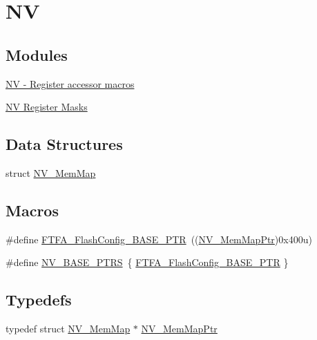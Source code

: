 \hypertarget{group___n_v___peripheral}{}\section{N\+V}
\label{group___n_v___peripheral}
\subsection*{Modules}
\begin{DoxyCompactItemize}
\item 
\hyperlink{group___n_v___register___accessor___macros}{N\+V -\/ Register accessor macros}
\item 
\hyperlink{group___n_v___register___masks}{N\+V Register Masks}
\end{DoxyCompactItemize}
\subsection*{Data Structures}
\begin{DoxyCompactItemize}
\item 
struct \hyperlink{struct_n_v___mem_map}{N\+V\+\_\+\+Mem\+Map}
\end{DoxyCompactItemize}
\subsection*{Macros}
\begin{DoxyCompactItemize}
\item 
\#define \hyperlink{group___n_v___peripheral_ga3458652dfc38239f92682556e63596b5}{F\+T\+F\+A\+\_\+\+Flash\+Config\+\_\+\+B\+A\+S\+E\+\_\+\+P\+T\+R}~((\hyperlink{group___n_v___peripheral_ga9aac431b01e6b976f2f4e32409ab725f}{N\+V\+\_\+\+Mem\+Map\+Ptr})0x400u)
\item 
\#define \hyperlink{group___n_v___peripheral_ga1e44e66a8945b675dcebb6fbd6bdc85b}{N\+V\+\_\+\+B\+A\+S\+E\+\_\+\+P\+T\+R\+S}~\{ \hyperlink{group___n_v___peripheral_ga3458652dfc38239f92682556e63596b5}{F\+T\+F\+A\+\_\+\+Flash\+Config\+\_\+\+B\+A\+S\+E\+\_\+\+P\+T\+R} \}
\end{DoxyCompactItemize}
\subsection*{Typedefs}
\begin{DoxyCompactItemize}
\item 
typedef struct \hyperlink{struct_n_v___mem_map}{N\+V\+\_\+\+Mem\+Map} $\ast$ \hyperlink{group___n_v___peripheral_ga9aac431b01e6b976f2f4e32409ab725f}{N\+V\+\_\+\+Mem\+Map\+Ptr}
\end{DoxyCompactItemize}


